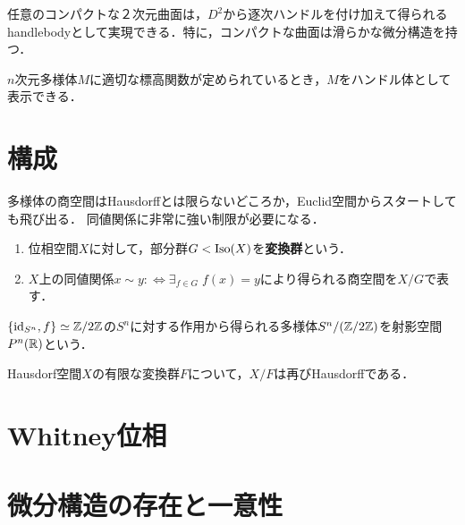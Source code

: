\documentclass[uplatex,dvipdfmx]{jsreport}
\begin{document}
\begin{theorem}
    任意のコンパクトな２次元曲面は，$D^2$から逐次ハンドルを付け加えて得られるhandlebodyとして実現できる．特に，コンパクトな曲面は滑らかな微分構造を持つ．
\end{theorem}

\begin{theorem}[Morse理論]
    $n$次元多様体$M$に適切な標高関数が定められているとき，$M$をハンドル体として表示できる．
\end{theorem}

\section{構成}\label{sec-construction}

\begin{tcolorbox}[colframe=ForestGreen, colback=ForestGreen!10!white,breakable,colbacktitle=ForestGreen!40!white,coltitle=black,fonttitle=\bfseries\sffamily,
title=]
    多様体の商空間はHausdorffとは限らないどころか，Euclid空間からスタートしても飛び出る．
    同値関係に非常に強い制限が必要になる．
\end{tcolorbox}

\begin{definition}\mbox{}
    \begin{enumerate}
        \item 位相空間$X$に対して，部分群$G<\mathrm{Iso}(X)$を\textbf{変換群}という．
        \item $X$上の同値関係$x\sim y:\Leftrightarrow\exists_{f\in G}\;f(x)=y$により得られる商空間を$X/G$で表す．
    \end{enumerate}
\end{definition}

\begin{example}
    $\{\mathrm{id}_{S^n},f\}\simeq \mathbb{Z}/2\mathbb{Z}$の$S^n$に対する作用から得られる多様体$S^n/(\mathbb{Z}/2\mathbb{Z})$を射影空間$P^{n}(\mathbb{R})$という．
\end{example}

\begin{theorem}
    Hausdorf空間$X$の有限な変換群$F$について，$X/F$は再びHausdorffである．
\end{theorem}

\section{Whitney位相}

\section{微分構造の存在と一意性}
\end{document}
